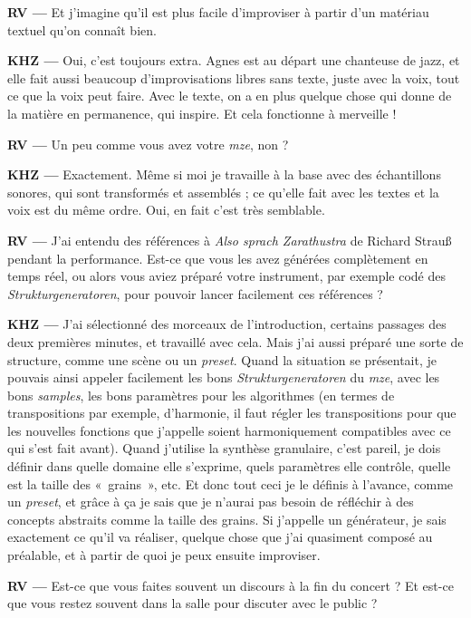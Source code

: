 \documentclass[a4paper,12pt]{article}
\newcommand{\guill}[1]{«~#1~»}
\newcommand{\maze}[0]{\emph{m\symbol{64}ze\textdegree2}}
\begin{document}
\textbf{RV ---} Et j'imagine qu'il est plus facile d'improviser à partir d'un matériau textuel qu'on connaît bien.

\textbf{KHZ ---} Oui, c'est toujours extra. Agnes est au départ une chanteuse de jazz, et elle fait aussi beaucoup d'improvisations libres sans texte, juste avec la voix, tout ce que la voix peut faire. Avec le texte, on a en plus quelque chose qui donne de la matière en permanence, qui inspire. Et cela fonctionne à merveille !

\textbf{RV ---} Un peu comme vous avez votre \maze, non ?

\textbf{KHZ ---} Exactement. Même si moi je travaille à la base avec des échantillons sonores, qui sont transformés et assemblés ; ce qu'elle fait avec les textes et la voix est du même ordre. Oui, en fait c'est très semblable.

\textbf{RV ---} J'ai entendu des références à \emph{Also sprach Zarathustra} de Richard Strauß pendant la performance. Est-ce que vous les avez générées complètement en temps réel, ou alors vous aviez préparé votre instrument, par exemple codé des \emph{Strukturgeneratoren}, pour pouvoir lancer facilement ces références ?

\textbf{KHZ ---} J'ai sélectionné des morceaux de l'introduction, certains passages des deux premières minutes, et travaillé avec cela. Mais j'ai aussi préparé une sorte de structure, comme une scène ou un \emph{preset}. Quand la situation se présentait, je pouvais ainsi appeler facilement les bons \emph{Strukturgeneratoren} du \maze, avec les bons \emph{samples}, les bons paramètres pour les algorithmes (en termes de transpositions par exemple, d'harmonie, il faut régler les transpositions pour que les nouvelles fonctions que j'appelle soient harmoniquement compatibles avec ce qui s'est fait avant). Quand j'utilise la synthèse granulaire, c'est pareil, je dois définir dans quelle domaine elle s'exprime, quels paramètres elle contrôle, quelle est la taille des \guill{grains}, etc. Et donc tout ceci je le définis à l'avance, comme un \emph{preset}, et grâce à ça je sais que je n'aurai pas besoin de réfléchir à des concepts abstraits comme la taille des grains. Si j'appelle un générateur, je sais exactement ce qu'il va réaliser, quelque chose que j'ai quasiment composé au préalable, et à partir de quoi je peux ensuite improviser.

\textbf{RV ---} Est-ce que vous faites souvent un discours à la fin du concert ? Et est-ce que vous restez souvent dans la salle pour discuter avec le public ?
\end{document}
